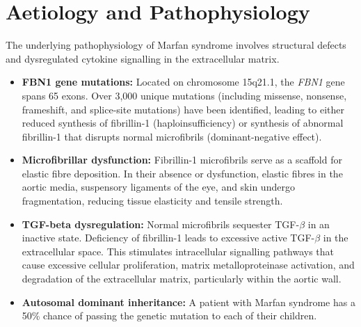 \section*{Aetiology and Pathophysiology}
The underlying pathophysiology of Marfan syndrome involves structural defects and dysregulated cytokine signalling in the extracellular matrix.
\begin{itemize}
    \item \textbf{FBN1 gene mutations:} Located on chromosome 15q21.1, the \textit{FBN1} gene spans 65 exons. Over 3,000 unique mutations (including missense, nonsense, frameshift, and splice-site mutations) have been identified, leading to either reduced synthesis of fibrillin-1 (haploinsufficiency) or synthesis of abnormal fibrillin-1 that disrupts normal microfibrils (dominant-negative effect).
    \item \textbf{Microfibrillar dysfunction:} Fibrillin-1 microfibrils serve as a scaffold for elastic fibre deposition. In their absence or dysfunction, elastic fibres in the aortic media, suspensory ligaments of the eye, and skin undergo fragmentation, reducing tissue elasticity and tensile strength.
    \item \textbf{TGF-beta dysregulation:} Normal microfibrils sequester TGF-$\beta$ in an inactive state. Deficiency of fibrillin-1 leads to excessive active TGF-$\beta$ in the extracellular space. This stimulates intracellular signalling pathways that cause excessive cellular proliferation, matrix metalloproteinase activation, and degradation of the extracellular matrix, particularly within the aortic wall.
    \item \textbf{Autosomal dominant inheritance:} A patient with Marfan syndrome has a 50\% chance of passing the genetic mutation to each of their children.
\end{itemize}


